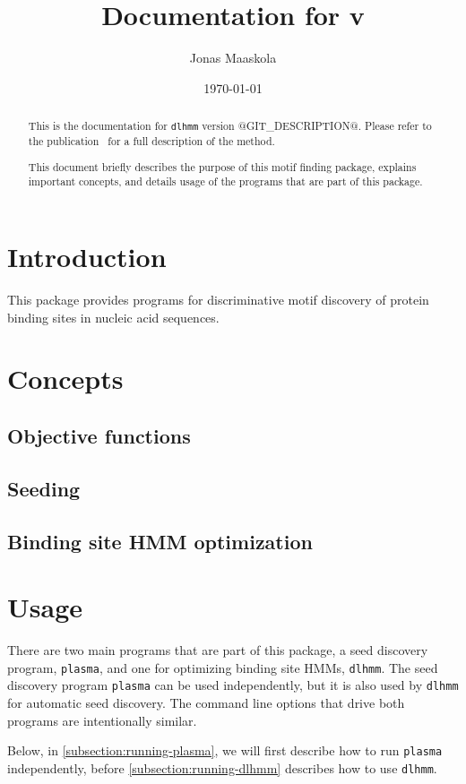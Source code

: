 \documentclass[a4paper]{article}
\title{Documentation for \dlhmm{} v\version{}}
\author{Jonas Maaskola}
\date{\today}
\makeatletter
\newcommand{\plasma}[0]{\texttt{plasma}}
\newcommand{\dlhmm}[0]{\texttt{dlhmm}}
\newcommand{\version}[0]{@GIT_DESCRIPTION@}
\makeatother
\begin{document}
\maketitle

\begin{abstract}
  This is the documentation for \dlhmm{} version \version{}.
  Please refer to the publication~\cite{Maaskola2013} for a full description of the method.

  This document briefly describes the purpose of this motif finding package, explains important concepts, and details usage of the programs that are part of this package.
\end{abstract}

\tableofcontents

\section{Introduction}
This package provides programs for discriminative motif discovery of protein binding sites in nucleic acid sequences.

\section{Concepts}
\subsection{Objective functions}
\subsection{Seeding}
\subsection{Binding site HMM optimization}

\section{Usage}
There are two main programs that are part of this package, a seed discovery program, \plasma{}, and one for optimizing binding site HMMs, \dlhmm{}.
The seed discovery program \plasma{} can be used independently, but it is also used by \dlhmm{} for automatic seed discovery.
The command line options that drive both programs are intentionally similar.

Below, in \cref{subsection:running-plasma}, we will first describe how to run \plasma{} independently, before \cref{subsection:running-dlhmm} describes how to use \dlhmm{}.
\end{document}
